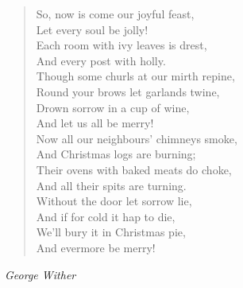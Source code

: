 
\begin{verse}
So, now is come our joyful feast,\\
\hspace*{2em}Let every soul be jolly!\\
Each room with ivy leaves is drest,\\
\hspace*{2em}And every post with holly.\\
Though some churls at our mirth repine,\\
Round your brows let garlands twine,\\
Drown sorrow in a cup of wine,\\
\hspace*{2em}And let us all be merry!\\[0.7em]

Now all our neighbours' chimneys smoke,\\
\hspace*{2em}And Christmas logs are burning;\\
Their ovens with baked meats do choke,\\
\hspace*{2em}And all their spits are turning.\\
Without the door let sorrow lie,\\
And if for cold it hap to die,\\
We'll bury it in Christmas pie,\\
\hspace*{2em}And evermore be merry!%
\end{verse}

\vspace{0.5\baselineskip}
\noindent\textit{George Wither}

\newpage
